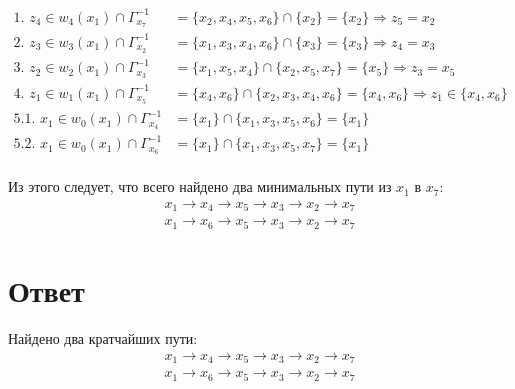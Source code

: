 \documentclass{article}
\begin{document}
\begin{align*}
    \text{1.   } z_4 \in w_4(x_1) \cap \Gamma^{-1}_{x_7} &=
\{x_2, x_4, x_5, x_6\} \cap \{x_2\} = \{x_2\} \Rightarrow z_5 = x_2 \\
    \text{2.   } z_3 \in w_3(x_1) \cap \Gamma^{-1}_{x_2} &=
\{x_1, x_3, x_4, x_6\} \cap \{x_3\} = \{x_3\} \Rightarrow z_4 = x_3 \\
    \text{3.   } z_2 \in w_2(x_1) \cap \Gamma^{-1}_{x_3} &=
\{x_1, x_5, x_4\} \cap \{x_2, x_5, x_7\} = \{x_5\} \Rightarrow z_3 = x_5 \\
    \text{4.   } z_1 \in w_1(x_1) \cap \Gamma^{-1}_{x_5} &=
\{x_4, x_6\} \cap \{x_2, x_3, x_4, x_6\} = \{x_4, x_6\} \Rightarrow
z_1 \in \{x_4, x_6\} \\
    \text{5.1. } x_1 \in w_0(x_1) \cap \Gamma^{-1}_{x_4} &=
\{x_1\} \cap \{x_1, x_3, x_5, x_6\} = \{x_1\} \\
    \text{5.2. } x_1 \in w_0(x_1) \cap \Gamma^{-1}_{x_6} &=
\{x_1\} \cap \{x_1, x_3, x_5, x_7\} = \{x_1\} \\
\end{align*}

Из этого следует, что всего найдено два минимальных пути из $x_1$ в $x_7$:
\begin{align*}
    x_1 \rightarrow x_4 \rightarrow x_5 \rightarrow x_3 \rightarrow x_2 \rightarrow x_7 \\
    x_1 \rightarrow x_6 \rightarrow x_5 \rightarrow x_3 \rightarrow x_2 \rightarrow x_7
\end{align*}


\section*{Ответ}
Найдено два кратчайших пути:
\begin{align*}
    x_1 \rightarrow x_4 \rightarrow x_5 \rightarrow x_3 \rightarrow x_2 \rightarrow x_7 \\
    x_1 \rightarrow x_6 \rightarrow x_5 \rightarrow x_3 \rightarrow x_2 \rightarrow x_7
\end{align*}
\end{document}
